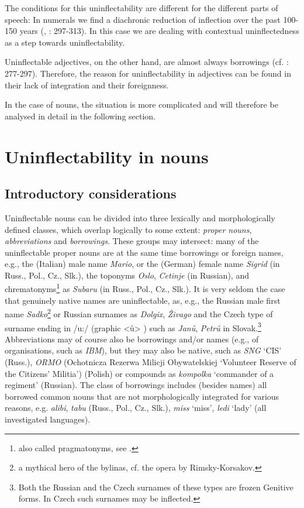\documentclass[output=paper]{langscibook}
\begin{document}
The conditions for this uninflectability are different for the different parts of speech: In numerals we find a diachronic reduction of inflection over the past 100-150 years (\citealt{Suprun1969}, \citealt{Doleschal2000}: 297-313). In this case we are dealing with contextual uninflectedness as a step towards uninflectability. 

Uninflectable adjectives, on the other hand, are almost always borrowings (cf. \citealt{Doleschal2000}: 277-297). Therefore, the reason for uninflectability in adjectives can be found in their lack of integration and their foreignness.

In the case of nouns, the situation is more complicated and will therefore be analysed in detail in the following section.

\section{Uninflectability in nouns} %
\subsection{Introductory considerations}  %

Uninflectable nouns can be divided into three lexically and morphologically defined classes, which overlap logically to some extent: \textit{proper nouns}, \textit{abbreviations} and \textit{borrowings}. These groups may intersect: many of the uninflectable proper nouns are at the same time borrowings or foreign names, e.g., the (Italian) male name \textit{Mario}, or the (German) female name \textit{Sigrid} (in Russ., Pol., Cz., Slk.), the toponyms \textit{Oslo}, \textit{Cetinje} (in Russian), and chrematonyms\footnote{ \textrm{also called pragmatonyms, see \citealt{Zgusta1996}.}} as \textit{Subaru} (in Russ., Pol., Cz., Slk.). It is very seldom the case that genuinely native names are uninflectable, as, e.g., the Russian male first name \textit{Sadko}\footnote{ \textrm{a mythical hero of the bylinas, cf. the opera by Rimsky-Korsakov.}} or Russian surnames as \textit{Dolgix}, \textit{Živago} and the Czech type of surname ending in /u:/ (graphic <ů> ) such as \textit{Janů}, \textit{Petrů} in Slovak.\footnote{ \textrm{Both the Russian and the Czech surnames of these types are frozen Genitive forms. In Czech such surnames may be inflected.}} Abbreviations may of course also be borrowings and/or names (e.g., of organisations, such as \textit{IBM}), but they may also be native, such as \textit{SNG} ‘CIS’ (Russ.), \textit{ORMO} (Ochotnicza Rezerwa Milicji Obywatelskiej ‘Volunteer Reserve of the Citizens' Militia’) (Polish) or compounds as \textit{kompolka} ‘commander of a regiment’ (Russian). The class of borrowings includes (besides names) all borrowed common nouns that are not morphologically integrated for various reasons, e.g. \textit{alibi}, \textit{tabu} (Russ., Pol., Cz., Slk.), \textit{miss} ‘miss’, \textit{ledi} ‘lady’ (all investigated languages). 
\end{document}
